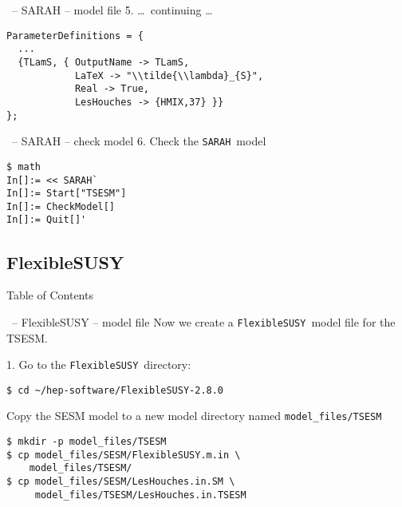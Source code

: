 \documentclass[11pt]{beamer}
\newcommand{\FlexibleSUSY}{\texttt{FlexibleSUSY}}
\newcommand{\SARAH}{\texttt{SARAH}}
\begin{document}

\begin{frame}[fragile]{\insertsection\ -- SARAH -- model file}
  5. \ldots\ continuing \ldots
  \begin{lstlisting}
ParameterDefinitions = {
  ...
  {TLamS, { OutputName -> TLamS,
            LaTeX -> "\\tilde{\\lambda}_{S}",
            Real -> True, 
            LesHouches -> {HMIX,37} }}
};\end{lstlisting}
\end{frame}


\begin{frame}[fragile]{\insertsection\ -- SARAH -- check model}
  6. Check the \SARAH\ model
  \begin{lstlisting}
$ math
In[]:= << SARAH`
In[]:= Start["TSESM"]
In[]:= CheckModel[]
In[]:= Quit[]'\end{lstlisting}%
\end{frame}


\subsection{FlexibleSUSY}


\begin{frame}{Table of Contents}
\end{frame}


\begin{frame}[fragile]{\insertsection\ -- FlexibleSUSY -- model file}
  Now we create a \FlexibleSUSY\ model file for the TSESM.

  \bigskip

  1. Go to the \FlexibleSUSY\ directory:
  \begin{lstlisting}
$ cd ~/hep-software/FlexibleSUSY-2.8.0\end{lstlisting}%
  Copy the SESM model to a new model directory named
  \texttt{model\_files/TSESM}
  \begin{lstlisting}
$ mkdir -p model_files/TSESM
$ cp model_files/SESM/FlexibleSUSY.m.in \
    model_files/TSESM/
$ cp model_files/SESM/LesHouches.in.SM \
     model_files/TSESM/LesHouches.in.TSESM\end{lstlisting}%
\end{frame}
\end{document}
